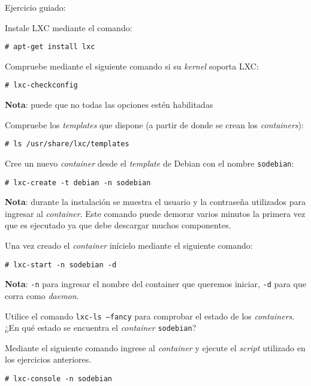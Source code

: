 Ejercicio guiado:
\begin{questions}

  \question Instale LXC mediante el comando:
\begin{verbatim}
# apt-get install lxc
\end{verbatim}
  
  \question Compruebe mediante el siguiente comando si su \textit{kernel} soporta
  LXC:
\begin{verbatim}
# lxc-checkconfig
\end{verbatim}
  \textbf{Nota}: puede que no todas las opciones estén habilitadas

  \question Compruebe los \textit{templates} que dispone (a partir de donde se
  crean los \textit{containers}):
\begin{verbatim}
# ls /usr/share/lxc/templates
\end{verbatim}
  
  \question Cree un nuevo \textit{container} desde el \textit{template} de Debian
  con el nombre \texttt{sodebian}:
\begin{verbatim}
# lxc-create -t debian -n sodebian
\end{verbatim}
  \textbf{Nota}: durante la instalación se muestra el usuario y la
  contraseña utilizados para ingresar al \textit{container}. Este comando
  puede demorar varios minutos la primera vez que es ejecutado ya que debe
  descargar muchos componentes.
  
  \question Una vez creado el \textit{container} inícielo mediante el siguiente
  comando:
\begin{verbatim}
# lxc-start -n sodebian -d
\end{verbatim}
  \textbf{Nota}: \texttt{-n} para ingresar el nombre del container que
  queremos iniciar, \texttt{-d} para que corra como \textit{daemon}.
  
  \question Utilice el comando \texttt{lxc-ls --fancy} para comprobar el estado
  de los \textit{containers}. ¿En qué estado se encuentra el
  \textit{container} \texttt{sodebian}?
  
  \question Mediante el siguiente comando ingrese al \textit{container} y
  ejecute el \textit{script} utilizado en los ejercicios anteriores.
\begin{verbatim}
# lxc-console -n sodebian
\end{verbatim}

\end{questions}
